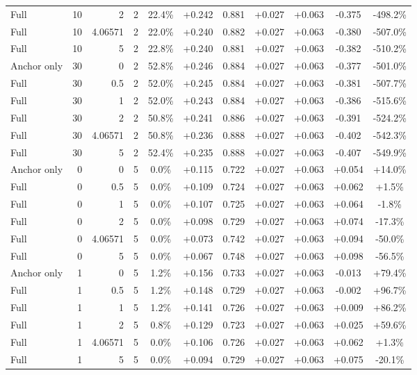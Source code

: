 \begin{table}[htbp]
\begin{tabular}{lrrrccccccc}
Full & 10 & 2 & 2 & 22.4\% & +0.242 & 0.881 & +0.027 & +0.063 & -0.375 & -498.2\% \\
Full & 10 & 4.06571 & 2 & 22.0\% & +0.240 & 0.882 & +0.027 & +0.063 & -0.380 & -507.0\% \\
Full & 10 & 5 & 2 & 22.8\% & +0.240 & 0.881 & +0.027 & +0.063 & -0.382 & -510.2\% \\
Anchor only & 30 & 0 & 2 & 52.8\% & +0.246 & 0.884 & +0.027 & +0.063 & -0.377 & -501.0\% \\
Full & 30 & 0.5 & 2 & 52.0\% & +0.245 & 0.884 & +0.027 & +0.063 & -0.381 & -507.7\% \\
Full & 30 & 1 & 2 & 52.0\% & +0.243 & 0.884 & +0.027 & +0.063 & -0.386 & -515.6\% \\
Full & 30 & 2 & 2 & 50.8\% & +0.241 & 0.886 & +0.027 & +0.063 & -0.391 & -524.2\% \\
Full & 30 & 4.06571 & 2 & 50.8\% & +0.236 & 0.888 & +0.027 & +0.063 & -0.402 & -542.3\% \\
Full & 30 & 5 & 2 & 52.4\% & +0.235 & 0.888 & +0.027 & +0.063 & -0.407 & -549.9\% \\
Anchor only & 0 & 0 & 5 & 0.0\% & +0.115 & 0.722 & +0.027 & +0.063 & +0.054 & +14.0\% \\
Full & 0 & 0.5 & 5 & 0.0\% & +0.109 & 0.724 & +0.027 & +0.063 & +0.062 & +1.5\% \\
Full & 0 & 1 & 5 & 0.0\% & +0.107 & 0.725 & +0.027 & +0.063 & +0.064 & -1.8\% \\
Full & 0 & 2 & 5 & 0.0\% & +0.098 & 0.729 & +0.027 & +0.063 & +0.074 & -17.3\% \\
Full & 0 & 4.06571 & 5 & 0.0\% & +0.073 & 0.742 & +0.027 & +0.063 & +0.094 & -50.0\% \\
Full & 0 & 5 & 5 & 0.0\% & +0.067 & 0.748 & +0.027 & +0.063 & +0.098 & -56.5\% \\
Anchor only & 1 & 0 & 5 & 1.2\% & +0.156 & 0.733 & +0.027 & +0.063 & -0.013 & +79.4\% \\
Full & 1 & 0.5 & 5 & 1.2\% & +0.148 & 0.729 & +0.027 & +0.063 & -0.002 & +96.7\% \\
Full & 1 & 1 & 5 & 1.2\% & +0.141 & 0.726 & +0.027 & +0.063 & +0.009 & +86.2\% \\
Full & 1 & 2 & 5 & 0.8\% & +0.129 & 0.723 & +0.027 & +0.063 & +0.025 & +59.6\% \\
Full & 1 & 4.06571 & 5 & 0.0\% & +0.106 & 0.726 & +0.027 & +0.063 & +0.062 & +1.3\% \\
Full & 1 & 5 & 5 & 0.0\% & +0.094 & 0.729 & +0.027 & +0.063 & +0.075 & -20.1\% \\

\end{tabular}
\end{table}
